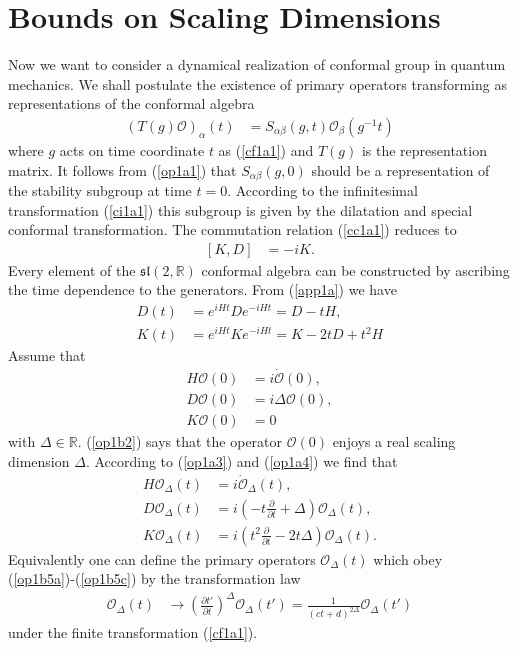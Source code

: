 \documentclass[12pt]{article}
\numberwithin{equation}{section}
\begin{document}
\section{Bounds on Scaling Dimensions}
\label{nogosec}
Now we want to consider a dynamical realization 
of conformal group in quantum mechanics. 
We shall postulate the existence of primary operators 
transforming as representations of the conformal algebra
\begin{align}
\label{op1a1}
\left(
T(g)\mathcal{O}
\right)_{\alpha}(t)&=S_{\alpha\beta}(g,t)\mathcal{O}_{\beta}(g^{-1}t)
\end{align}
where $g$ acts on time coordinate $t$ as (\ref{cf1a1}) 
and $T(g)$ is the representation matrix. 
It follows from (\ref{op1a1}) that 
$S_{\alpha\beta}(g,0)$ should be a representation of 
the stability subgroup at time $t=0$. 
According to the infinitesimal transformation (\ref{ci1a1}) 
this subgroup is given by the dilatation and special conformal
transformation. 
The commutation relation (\ref{cc1a1}) reduces to 
\begin{align}
\label{op1a2}
[K,D]&=-iK
.
\end{align}
Every element of the $\mathfrak{sl}(2,\mathbb{R})$ 
conformal algebra can be constructed 
by ascribing the time dependence to the generators. 
From (\ref{app1a}) we have
\begin{align}
\label{op1a3}
D(t)&=e^{iHt}De^{-iHt}=D-tH,\\
\label{op1a4}
K(t)&=e^{iHt}Ke^{-iHt}=K-2tD+t^{2}H
\end{align}
Assume that 
\begin{align}
\label{op1b1}
H\mathcal{O}(0)&=i\dot{\mathcal{O}}(0),\\
\label{op1b2}
D\mathcal{O}(0)&=i\Delta\mathcal{O}(0),\\
\label{op1b3}
K\mathcal{O}(0)&=0
\end{align}
with $\Delta\in\mathbb{R}$. 
(\ref{op1b2}) says that the operator $\mathcal{O}(0)$ enjoys a real scaling dimension $\Delta$. 
According to (\ref{op1a3}) and (\ref{op1a4}) 
we find that 
\begin{align}
\label{op1b5a}
H\mathcal{O}_{\Delta}(t)&=i\dot{\mathcal{O}}_{\Delta}(t),\\
\label{op1b5b}
D\mathcal{O}_{\Delta}(t)&=
i\left(-t\frac{\partial}{\partial t}+\Delta
\right)\mathcal{O}_{\Delta}(t),\\
\label{op1b5c}
K\mathcal{O}_{\Delta}(t)&=
i\left(
t^{2}\frac{\partial}{\partial t}-2t\Delta
\right)\mathcal{O}_{\Delta}(t). 
\end{align}
Equivalently one can define the primary operators $\mathcal{O}_{\Delta}(t)$ 
which obey (\ref{op1b5a})-(\ref{op1b5c}) by the transformation law
\begin{align}
\label{op1b6a}
\mathcal{O}_{\Delta}(t)&\rightarrow 
\left(
\frac{\partial t'}{\partial t}
\right)^{\Delta}\mathcal{O}_{\Delta}(t')
=\frac{1}{(ct+d)^{2\Delta}}\mathcal{O}_{\Delta}(t')
\end{align}
under the finite transformation (\ref{cf1a1}). 
\end{document}
